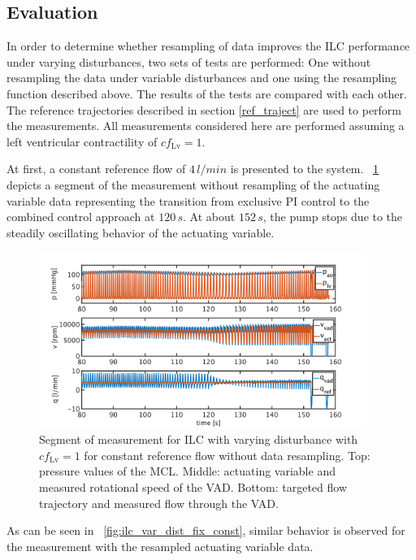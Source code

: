 \subsection{Evaluation}
In order to determine whether resampling of data improves the ILC performance under varying disturbances, two sets of tests are performed: One without resampling the data under variable disturbances and one using the resampling function described above. The results of the tests are compared with each other.
The reference trajectories described in section \ref{ref_traject} are used to perform the measurements. All measurements considered here are performed assuming a left ventricular contractility of $cf_{\mathrm{Lv}}=1$.


At first, a constant reference flow of $4\,l/min$ is presented to the system. \figurename~\ref{fig:ilc_var_dist_unfix_const} depicts a segment of the measurement without resampling of the actuating variable data representing the transition from exclusive PI control to the combined control approach at $120\,s$. At about $152\,s$, the pump stops due to the steadily oscillating behavior of the actuating variable.
\begin{figure}[ht!]
  \centering
  \includegraphics[width=0.95\textwidth]{images/chapt_5/ILC/ilc_var_dist_unfix_const.pdf}
  \caption[Segment of measurement for ILC with varying disturbance with $cf_{\mathrm{Lv}}=1$ for constant reference flow without data resampling]{Segment of measurement for ILC with varying disturbance with $cf_{\mathrm{Lv}}=1$ for constant reference flow without data resampling. Top:  pressure values of the MCL. Middle: actuating variable and measured rotational speed of the VAD. Bottom: targeted flow trajectory and measured flow through the VAD.}
  \label{fig:ilc_var_dist_unfix_const}
\end{figure}
As can be seen in \figurename~\ref{fig:ilc_var_dist_fix_const}, similar behavior is observed for the measurement with the resampled actuating variable data.
